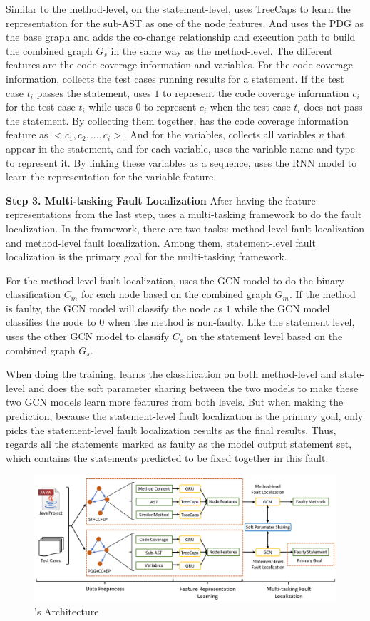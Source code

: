 Similar to the method-level, on the statement-level, \tool uses TreeCaps to learn the representation for the sub-AST as one of the node features. And \tool uses the PDG as the base graph and adds the co-change relationship and execution path to build the combined graph $G_s$ in the same way as the method-level. The different features are the code coverage information and variables. For the code coverage information, \tool collects the test cases running results for a statement. If the test case $t_i$ passes the statement, \tool uses $1$ to represent the code coverage information $c_i$ for the test case $t_i$ while \tool uses $0$ to represent $c_i$ when the test case $t_i$ does not pass the statement. By collecting them together, \tool has the code coverage information feature as $<c_1, c_2, ..., c_i>$. And for the variables, \tool collects all variables $v$ that appear in the statement, and for each variable, \tool uses the variable name and type to represent it. By linking these variables as a sequence, \tool uses the RNN model to learn the representation for the variable feature.

{\bf Step 3. Multi-tasking Fault Localization} After having the feature representations from the last step, \tool uses a multi-tasking framework to do the fault localization. In the framework, there are two tasks: method-level fault localization and method-level fault localization. Among them, statement-level fault localization is the primary goal for the multi-tasking framework.

For the method-level fault localization, \tool uses the GCN model \cite{kipf2016semi} to do the binary classification $C_m$ for each node based on the combined graph $G_m$. If the method is faulty, the GCN model will classify the node as $1$ while the GCN model classifies the node to $0$ when the method is non-faulty. Like the statement level, \tool uses the other GCN model to classify $C_s$ on the statement level based on the combined graph $G_s$.

When doing the training, \tool learns the classification on both method-level and state-level and does the soft parameter sharing between the two models to make these two GCN models learn more features from both levels. But when making the prediction, because the statement-level fault localization is the primary goal, \tool only picks the statement-level fault localization results as the final results. Thus, \tool regards all the statements marked as faulty as the model output statement set, which contains the statements predicted to be fixed together in this fault.

\begin{figure}[t]
	\centering
	\includegraphics[width=6.5in]{graphs/overview.png}
	\caption{{\tool}'s Architecture}
	\label{overview}
\end{figure}



